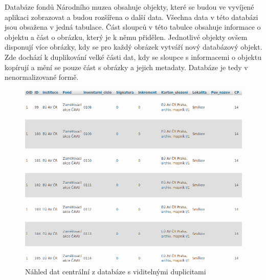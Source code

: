 Databáze fondů Národního muzea obsahuje objekty, které se budou ve 
vyvíjené aplikaci zobrazovat a budou rozšířena o další data. Všechna data 
v této databázi jsou obsažena v jedná tabulace. Část sloupců v této tabulce 
obsahuje informace o objektu a část o obrázku, který je k němu přidělen. 
Jednotlivé objekty ovšem disponují více obrázky, kdy se pro každý obrázek 
vytváří nový databázový objekt. Zde dochází k duplikování velké části dat, 
kdy se sloupce s informacemi o objektu kopírují a mění se pouze část s 
obrázky a jejich metadaty. Databáze je tedy v nenormalizované formě.

\begin{figure}[H] \centering
    \includegraphics[width=420pt]{./pictures/5-ukazka-basedata.PNG}
    \caption[Náhled dat z centrální databáze s viditelnými duplicitami]{Náhled dat centrální z databáze s viditelnými duplicitami}
	\label{fig:Náhled dat z centrální databáze s viditelnými duplicitami}              
\end{figure}


